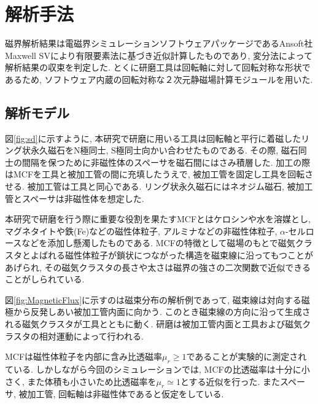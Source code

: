 \documentclass[11pt]{jarticle}
\begin{document}
\section{解析手法}
磁界解析結果は電磁界シミュレーションソフトウェアパッケージであるAnsoft社Maxwell SVにより有限要素法に基づき近似計算したものであり, 変分法によって解析結果の収束を判定した. とくに研磨工具は回転軸に対して回転対称な形状であるため, ソフトウェア内蔵の回転対称な２次元静磁場計算モジュールを用いた. \par

  \subsection{解析モデル}
図\ref{fig:sd}に示すように, 本研究で研磨に用いる工具は回転軸と平行に着磁したリング状永久磁石をN極同士, S極同士向かい合わせたものである. その際, 磁石同士の間隔を保つために非磁性体のスペーサを磁石間にはさみ積層した. 加工の際はMCFを工具と被加工管の間に充填したうえで, 被加工管を固定し工具を回転させる. 被加工管は工具と同心である. リング状永久磁石にはネオジム磁石, 被加工管とスペーサは非磁性体を想定した. \par
本研究で研磨を行う際に重要な役割を果たすMCFとはケロシンや水を溶媒とし, マグネタイトや鉄(Fe)などの磁性体粒子, アルミナなどの非磁性体粒子, $\alpha$-セルロースなどを添加し懸濁したものである. MCFの特徴として磁場のもとで磁気クラスタとよばれる磁性体粒子が鎖状につながった構造を磁束線に沿ってもつことがあげられ, その磁気クラスタの長さや太さは磁界の強さの二次関数で近似できることがしられている\cite{機能性流体}. \par
図\ref{fig:MagneticFlux}に示すのは磁束分布の解析例であって, 磁束線は対向する磁極から反発しあい被加工管内面に向かう. このとき磁束線の方向に沿って生成される磁気クラスタが工具とともに動く. 研磨は被加工管内面と工具および磁気クラスタの相対運動によって行われる. \par
MCFは磁性体粒子を内部に含み比透磁率$\mu_r\geq1$であることが実験的に測定されている\cite{MCF磁気特性}. しかしながら今回のシミュレーションでは, MCFの比透磁率は十分に小さく, また体積も小さいため比透磁率を$\mu_r\simeq1$とする近似を行った. またスペーサ, 被加工管, 回転軸は非磁性体であると仮定をしている. 
　
\end{document}
